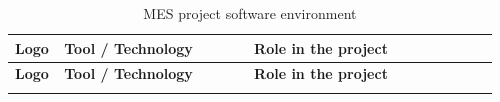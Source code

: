 \begin{longtable}{@{}>{\centering\arraybackslash}m{0.09\linewidth}>{\centering\arraybackslash}m{0.38\linewidth}>{\centering\arraybackslash}m{0.49\linewidth}@{}}
	\caption{MES project software environment}
	\label{tab:mescha-env_logiciel} \\
	\toprule
	\textbf{Logo}                                                                   & \textbf{Tool / Technology}              & \textbf{Role in the project} \\
	\midrule
	\endfirsthead

	\toprule
	\textbf{Logo}                                                                   & \textbf{Tool / Technology}              & \textbf{Role in the project} \\
	\midrule
	\endhead


	\endlastfoot


\end{longtable}
